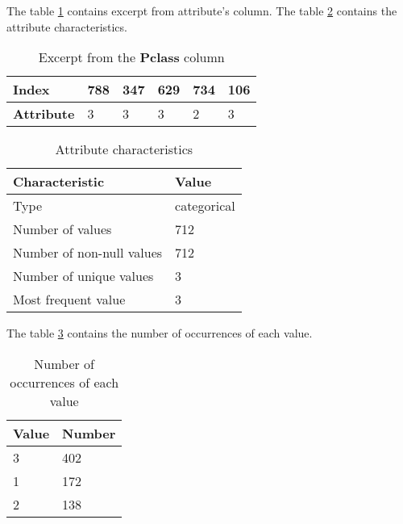 The table \ref{table:pclass_head} contains excerpt from attribute's column.
The table \ref{table:pclass_characteristics} contains the attribute 
characteristics.

\begin{table}[!ht]
    \centering
    \caption{Excerpt from the \textbf{Pclass} column}
    \begin{tabular}{|l|l|l|l|l|l|}
        \hline
        \textbf{Index}     & 788 & 347 & 629 & 734 & 106 \\ \hline
        \textbf{Attribute} & 3   & 3   & 3   & 2   & 3   \\ \hline
    \end{tabular}
    \label{table:pclass_head}
\end{table}

\begin{table}[!ht]
    \centering
    \caption{Attribute characteristics}
    \begin{tabular}{|l|l|}
        \hline
        \textbf{Characteristic}   & \textbf{Value} \\ \hline
        Type                      & categorical    \\ \hline
        Number of values          & 712            \\ \hline
        Number of non-null values & 712            \\ \hline
        Number of unique values   & 3              \\ \hline
        Most frequent value       & 3              \\ \hline
    \end{tabular}
    \label{table:pclass_characteristics}
\end{table}

The table \ref{table:pclass_value_counts} contains the number of occurrences of
each value.

\begin{table}[!ht]
    \centering
    \caption{Number of occurrences of each value}
    \begin{tabular}{|l|l|}
        \hline
        \textbf{Value} & \textbf{Number} \\ \hline
        3              & 402             \\ \hline
        1              & 172             \\ \hline
        2              & 138             \\ \hline
    \end{tabular}
    \label{table:pclass_value_counts}
\end{table}

